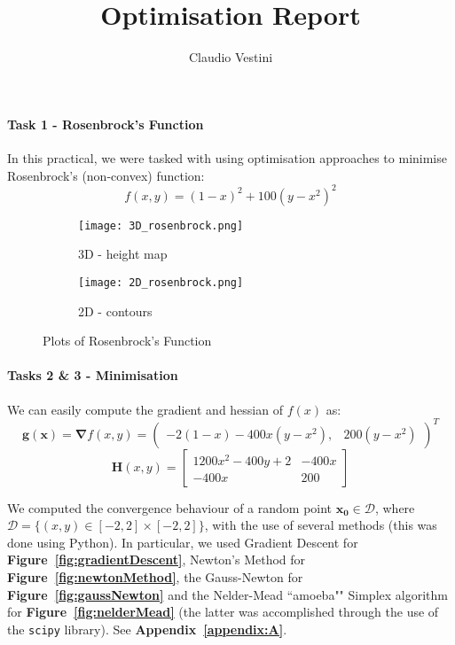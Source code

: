 \documentclass[hidelinks]{article}
\title{\vspace{-1cm} Optimisation Report}
\author{\vspace{-2cm} Claudio Vestini}
\date{}
\begin{document}
\maketitle
%
\paragraph{Task 1 - Rosenbrock's Function}
In this practical, we were tasked with using optimisation approaches to minimise Rosenbrock's (non-convex) function:
\[
f(x, y) = (1 - x)^2 + 100(y - x^2)^2
\]
%
\begin{figure}[h]
    \centering
    \begin{subfigure}[t]{0.49\textwidth}
        \centering
        \texttt{[image: 3D\_rosenbrock.png]}
        \caption{3D - height map}
        \label{fig:3Drosenbrock}
    \end{subfigure}
    \hfill
    \begin{subfigure}[t]{0.49\textwidth}
        \centering
        \texttt{[image: 2D\_rosenbrock.png]}
        \caption{2D - contours}
        \label{fig:2Drosenbrock}
    \end{subfigure}
    \caption{Plots of Rosenbrock's Function}
    \label{fig:functionPlots}
\end{figure}
%
\paragraph{Tasks 2 \& 3 - Minimisation}
We can easily compute the gradient and hessian of $f(x)$ as:
\[
\mathbf{g(\mathbf{x})} = \boldsymbol{\nabla} f(x, y) = 
\begin{pmatrix}
-2(1 - x) - 400x(y - x^2), & 200(y - x^2)
\end{pmatrix}^{T}
\]
\[
\mathbf{H}(x, y) =
\begin{bmatrix}
1200x^2 - 400y + 2 & -400x \\
-400x & 200
\end{bmatrix}
\]
\par We computed the convergence behaviour of a random point $\mathbf{x_0} \in \mathcal{D}$, where $\mathcal{D} = \{ (x, y) \in [-2, 2] \times [-2, 2] \}$, with the use of several methods (this was done using Python). In particular, we used Gradient Descent for \textbf{Figure~\ref{fig:gradientDescent}}, Newton's Method for \textbf{Figure~\ref{fig:newtonMethod}}, the Gauss-Newton for \textbf{Figure~\ref{fig:gaussNewton}} and the Nelder-Mead ``amoeba"" Simplex algorithm for \textbf{Figure~\ref{fig:nelderMead}} (the latter was accomplished through the use of the \texttt{scipy} library). See \textbf{Appendix~\ref{appendix:A}}.
\end{document}
